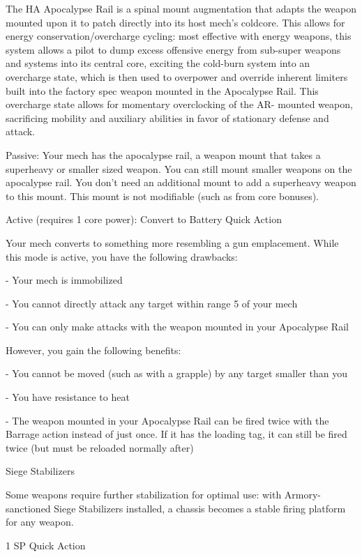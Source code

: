  The HA Apocalypse Rail is a spinal mount augmentation that adapts the weapon mounted upon it to  
 patch directly into its host mech’s coldcore. This allows for energy conservation/overcharge cycling:  
 most effective with energy weapons, this system allows a pilot to dump excess offensive energy from  
 sub-super weapons and systems into its central core, exciting the cold-burn system into an overcharge  
 state, which is then used to overpower and override inherent limiters built into the factory spec weapon  
 mounted in the Apocalypse Rail. This overcharge state allows for momentary overclocking of the AR- 
 mounted weapon, sacrificing mobility and auxiliary abilities in favor of stationary defense and attack.   

 Passive: Your mech has the apocalypse rail, a weapon mount that takes a superheavy or smaller sized  
 weapon. You can still mount smaller weapons on the apocalypse rail. You don’t need an additional  
 mount to add a superheavy weapon to this mount. This mount is not modifiable (such as from core  
 bonuses).
 

 Active (requires 1 core power): Convert to Battery  
 Quick Action
 
 Your mech converts to something more resembling a gun emplacement. While this mode is active, you  
 have the following drawbacks:
 
      -   Your mech is immobilized
 
      -   You cannot directly attack any target within range 5 of your mech
 
      -   You can only make attacks with the weapon mounted in your Apocalypse Rail
 
 However, you gain the following benefits:
 
      -   You cannot be moved (such as with a grapple) by any target smaller than you
 
      -   You have resistance to heat
 
      -   The weapon mounted in your Apocalypse Rail can be fired twice with the Barrage action  
          instead of just once. If it has the loading tag, it can still be fired twice (but must be reloaded  
          normally after) 

Siege Stabilizers  

Some weapons require further stabilization for optimal use: with Armory-sanctioned Siege Stabilizers  
installed, a chassis becomes a stable firing platform for any weapon.   

1 SP  
Quick Action
 

